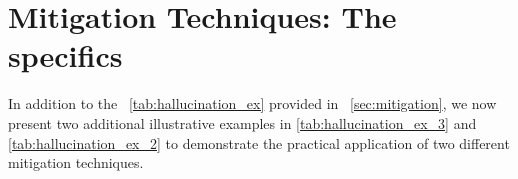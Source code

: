 \section{Mitigation Techniques: The specifics}
\label{sec:mitigation_appendix}
In addition to the ~\cref{tab:hallucination_ex} provided in ~\cref{sec:mitigation}, we now present two additional illustrative examples in \cref{tab:hallucination_ex_3} and \cref{tab:hallucination_ex_2} to demonstrate the practical application of two different mitigation techniques.



